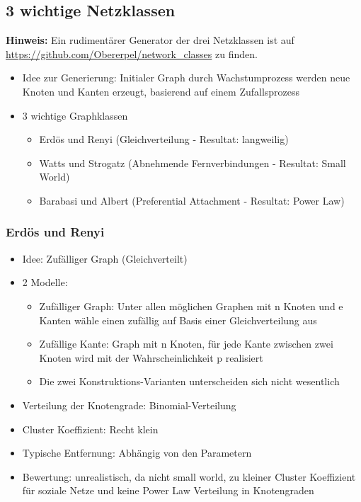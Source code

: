 \documentclass{article} %
\begin{document}
	\subsection{3 wichtige Netzklassen}
	\textbf{Hinweis:} Ein rudimentärer Generator der drei Netzklassen ist auf \url{https://github.com/Obererpel/network_classes} zu finden. 
	\begin{itemize}
		\item Idee zur Generierung: Initialer Graph durch Wachstumprozess werden neue Knoten und Kanten erzeugt, basierend auf einem Zufallsprozess
		\item 3 wichtige Graphklassen
		\begin{itemize}
			\item Erdös und Renyi (Gleichverteilung - Resultat: \glqq langweilig\grqq)
			\item Watts und Strogatz (Abnehmende Fernverbindungen - Resultat: Small World)
			\item Barabasi und Albert (Preferential Attachment - Resultat: Power Law)
		\end{itemize}
	\end{itemize}
	\subsubsection{Erdös und Renyi}
	\begin{itemize}
		\item Idee: Zufälliger Graph (Gleichverteilt)
		\item 2 Modelle:
		\begin{itemize}
			\item Zufälliger Graph: Unter allen möglichen Graphen mit n Knoten und e Kanten wähle einen zufällig auf Basis einer Gleichverteilung aus
			\item Zufällige Kante: Graph mit n Knoten, für jede Kante zwischen zwei Knoten wird mit der Wahrscheinlichkeit p realisiert
			\item Die zwei Konstruktions-Varianten unterscheiden sich \glqq nicht wesentlich\grqq
		\end{itemize}
		\item Verteilung der Knotengrade: Binomial-Verteilung
		\item Cluster Koeffizient: Recht klein
		\item Typische Entfernung: Abhängig von den Parametern
		\item Bewertung: unrealistisch, da nicht small world, zu kleiner Cluster Koeffizient für soziale Netze und keine Power Law Verteilung in Knotengraden
	\end{itemize}
	
\end{document}
